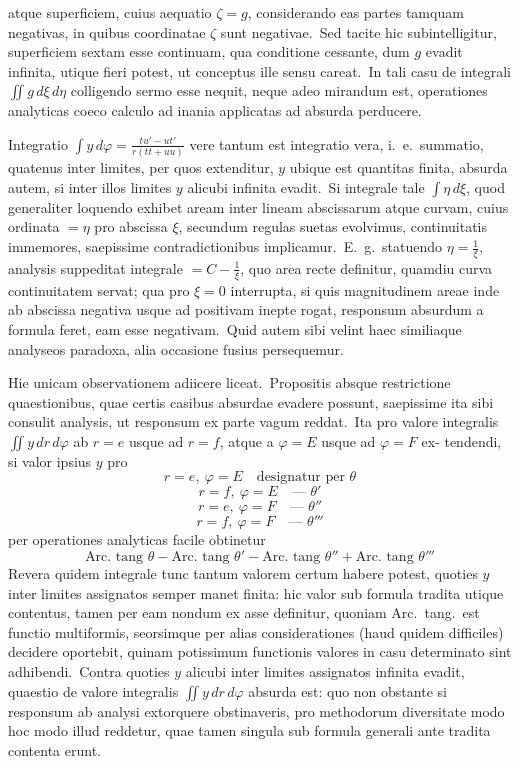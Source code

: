 \documentclass[12pt,a4paper]{article}
\theoremstyle{plain}
\begin{document}
atque superficiem, cuius aequatio $\zeta = g$, considerando eas partes tamquam negativas, in quibus coordinatae $\zeta$ sunt negativae.\ Sed tacite hic subintelligitur,
superficiem sextam esse continuam, qua conditione cessante, dum $g$ evadit infinita, utique fieri potest, ut conceptus ille sensu careat.\ In tali casu de integrali
$\iint g\, d\xi\, d\eta$ colligendo sermo esse nequit, neque adeo mirandum est, operationes
analyticas coeco calculo ad inania applicatas ad absurda perducere.

Integratio $\int y\, d\varphi = \frac{tu' - ut'}{r(tt+uu)}$ vere tantum est integratio vera, i.\ e.\ summatio, quatenus inter limites, per quos extenditur, $y$ ubique est quantitas finita,
absurda autem, si inter illos limites $y$ alicubi infinita evadit.\ Si integrale tale
$\int \eta\, d\xi$, quod generaliter loquendo exhibet aream inter lineam abscissarum atque
curvam, cuius ordinata $= \eta$ pro abscissa $\xi$, secundum regulas suetas evolvimus,
continuitatis immemores, saepissime contradictionibus implicamur.\ E.\ g.\ statuendo
$\eta = \frac{1}{\xi}$, analysis suppeditat integrale $= C - \frac{1}{\xi}$, quo area recte definitur, quamdiu curva continuitatem servat; qua pro $\xi = 0$ interrupta, si quis magnitudinem
areae inde ab abscissa negativa usque ad positivam inepte rogat, responsum absurdum a formula feret, eam esse negativam.\ Quid autem sibi velint haec similiaque
analyseos paradoxa, alia occasione fusius persequemur.

Hie unicam observationem adiicere liceat.\ Propositis absque restrictione
quaestionibus, quae certis casibus absurdae evadere possunt, saepissime ita sibi
consulit analysis, ut responsum ex parte vagum reddat.\ Ita pro valore integralis
$\iint y\, dr\, d\varphi$ ab $r = e$ usque ad $r = f$,
atque a $\varphi = E$ usque ad $\varphi = F$ ex-
tendendi, si valor ipsius $y$ pro
\[
r = e,\ \varphi = E \quad \text{designatur per } \theta
\]
\[
r = f,\ \varphi = E \quad \text{--- } \theta'
\]
\[
r = e,\ \varphi = F \quad \text{--- } \theta''
\]
\[
r = f,\ \varphi = F \quad \text{--- } \theta'''
\]
per operationes analyticas facile obtinetur
\[
\text{Arc.\ tang } \theta - \text{Arc.\ tang } \theta' - \text{Arc.\ tang } \theta'' + \text{Arc.\ tang } \theta'''
\]
Revera quidem integrale tunc tantum valorem certum habere potest, quoties $y$
inter limites assignatos semper manet finita: hic valor sub formula tradita utique
contentus, tamen per eam nondum ex asse definitur, quoniam Arc.\ tang.\ est functio
multiformis, seorsimque per alias considerationes (haud quidem difficiles) decidere
oportebit, quinam potissimum functionis valores in casu determinato sint adhibendi.\ Contra quoties $y$ alicubi inter limites assignatos infinita evadit, quaestio
de valore integralis $\iint y\, dr\, d\varphi$ absurda est: quo non obstante si responsum ab
analysi extorquere obstinaveris, pro methodorum diversitate modo hoc modo illud
reddetur, quae tamen singula sub formula generali ante tradita contenta erunt.
\end{document}
